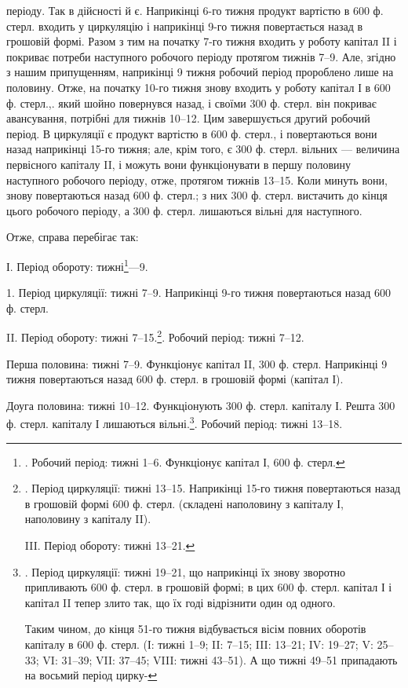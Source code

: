 \parcont{}  %
періоду. Так в дійсності й є. Наприкінці 6-го тижня продукт вартістю
в 600 ф. стерл. входить у циркуляцію і наприкінці 9-го тижня повертається
назад в грошовій формі. Разом з тим на початку 7-го тижня
входить у роботу капітал II і покриває потреби наступного робочого
періоду протягом тижнів 7--9. Але, згідно з нашим припущенням, наприкінці
9 тижня робочий період пророблено лише на половину. Отже, на
початку 10-го тижня знову входить у роботу капітал І в 600 ф. стерл.,.
який шойно повернувся назад, і своїми 300 ф. стерл. він покриває авансування,
потрібні для тижнів 10--12. Цим завершується другий робочий
період. В циркуляції є продукт вартістю в 600 ф. стерл., і повертаються
вони назад наприкінці 15-го тижня; але, крім того, є 300 ф. стерл.
вільних — величина первісного капіталу II, і можуть вони функціонувати
в першу половину наступного робочого періоду, отже, протягом тижнів
13--15. Коли минуть вони, знову повертаються назад 600 ф. стерл.;
з них 300 ф. стерл. вистачить до кінця цього робочого періоду, а
300 ф. стерл. лишаються вільні для наступного.

Отже, справа перебігає так:

І. Період обороту: тижні\footnote{
. Робочий період: тижні 1--6. Функціонує капітал І, 600 ф. стерл.
}—9.

1. Період циркуляції: тижні 7--9. Наприкінці 9-го тижня повертаються
назад 600 ф. стерл.

II. Період обороту: тижні 7--15.\footnote{
. Період циркуляції: тижні 13--15. Наприкінці 15-го тижня повертаються
назад в грошовій формі 600 ф. стерл. (складені наполовину
з капіталу І, наполовину з капіталу II).

III. Період обороту: тижні 13--21.
}. Робочий період: тижні 7--12.

Перша половина: тижні 7--9. Функціонує капітал II, 300 ф. стерл.
Наприкінці 9 тижня повертаються назад 600 ф. стерл. в грошовій формі
(капітал І).

Доуга половина: тижні 10--12. Функціонують 300 ф. стерл. капіталу
І. Решта 300 ф. стерл. капіталу І лишаються вільні.\footnote{
. Період циркуляції: тижні 19--21, що наприкінці їх знову зворотно
припливають 600 ф. стерл. в грошовій формі; в цих 600 ф. стерл.
капітал І і капітал II тепер злито так, що їх годі відрізнити один од одного.

Таким чином, до кінця 51-го тижня відбувається вісім повних оборотів
капіталу в 600 ф. стерл. (І: тижні 1--9; II: 7--15; III: 13--21;
IV: 19--27; V: 25--33; VI: 31--39; VII: 37--45; VIII: тижні
43--51). А що тижні 49--51 припадають на восьмий період цирку-
}. Робочий період: тижні 13--18.

